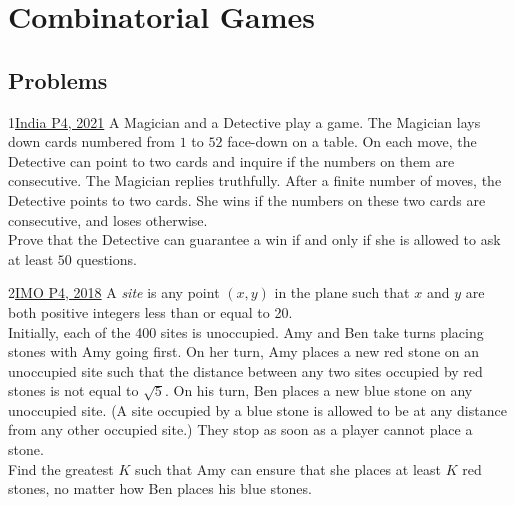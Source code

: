 \section{Combinatorial Games}
\subsection{Problems}
\begin{problem}{1}{\href{https://artofproblemsolving.com/community/q1h2478238p34659801}{India P4, 2021}} 
		A Magician and a Detective play a game. The Magician lays  down cards numbered from $1$ to $52$ face-down on a table. On each move, the Detective can point to two cards and inquire if the numbers on them are consecutive. The Magician replies truthfully. After a finite number of moves, the Detective points to two cards. She wins if the numbers on these two cards are consecutive, and loses otherwise.\\
	Prove that the Detective can guarantee a win if and only if she is allowed to ask at least $50$ questions.
\end{problem}


\begin{problem}{2}{\href{https://artofproblemsolving.com/community/c6h1671290p35965430}{IMO P4, 2018}}
		A \emph{site} is any point $(x, y)$ in the plane such that $x$ and $y$ are both positive integers less than or equal to 20.\\
	Initially, each of the 400 sites is unoccupied. Amy and Ben take turns placing stones with Amy going first. On her turn, Amy places a new red stone on an unoccupied site such that the distance between any two sites occupied by red stones is not equal to $\sqrt{5}$. On his turn, Ben places a new blue stone on any unoccupied site. (A site occupied by a blue stone is allowed to be at any distance from any other occupied site.) They stop as soon as a player cannot place a stone.\\
	Find the greatest $K$ such that Amy can ensure that she places at least $K$ red stones, no matter how Ben places his blue stones.
\end{problem}


